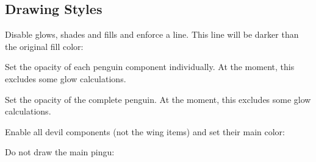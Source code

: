 \documentclass[parskip=half,english,numbers=noenddot,footnotes=nomultiple,oneside]{scrartcl}
\def\cursub{}
\begin{document}
\begin{tcblisting}{}
\begin{tikzpicture}
	\pingu[bill color=green]
\end{tikzpicture}
\end{tcblisting}
\endkeyexplain

\subsection{Drawing Styles}
\def\cursub{Styles!}
	Disable glows, shades and fills and enforce a line. This line will be darker
	than the original fill color:
\begin{tcblisting}{}
\begin{tikzpicture}
	\pingu[:line]
\end{tikzpicture}
\end{tcblisting}
\endkeyexplain

	Set the opacity of each penguin component individually. At the moment, this
	excludes some glow calculations.
\begin{tcblisting}{}
\end{tcblisting}
\endkeyexplain

	Set the opacity of the complete penguin. At the moment, this
	excludes some glow calculations.
\begin{tcblisting}{}
\begin{tikzpicture}
	\pingu[:ghost]
\end{tikzpicture}
\end{tcblisting}
\endkeyexplain

	Enable all devil components (not the wing items) and set their main color:
\begin{tcblisting}{}
\begin{tikzpicture}
	\pingu[:devil=green]
\end{tikzpicture}
\end{tcblisting}
\endkeyexplain


	Do not draw the main pingu:
\begin{tcblisting}{}
\end{tcblisting}
\endkeyexplain
\end{document}
